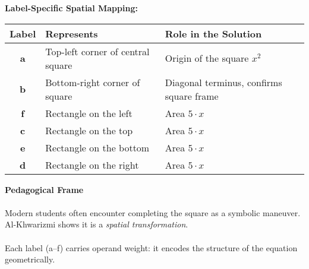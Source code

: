 \documentclass[9pt]{article}
\begin{document}
\vspace{1em}


\textbf{Label-Specific Spatial Mapping:}
\begin{center}
\begin{tabular}{|c|l|l|}
\hline
\textbf{Label} & \textbf{Represents} & \textbf{Role in the Solution} \\\hline
\textbf{a} & Top-left corner of central square & Origin of the square $x^2$ \\\hline
\textbf{b} & Bottom-right corner of square & Diagonal terminus, confirms square frame \\\hline
\textbf{f} & Rectangle on the left & Area $5 \cdot x$ \\\hline
\textbf{c} & Rectangle on the top & Area $5 \cdot x$ \\\hline
\textbf{e} & Rectangle on the bottom & Area $5 \cdot x$ \\\hline
\textbf{d} & Rectangle on the right & Area $5 \cdot x$ \\\hline
\end{tabular}
\end{center}

\vspace{1em}


\textbf{Pedagogical Frame} \\\\
Modern students often encounter completing the square as a symbolic maneuver. Al-Khwarizmi shows it is a \textit{spatial transformation}. \\\\
Each label (a--f) carries operand weight: it encodes the structure of the equation geometrically.

\vspace{1em}

\begin{center}
\end{center}
\end{document}
